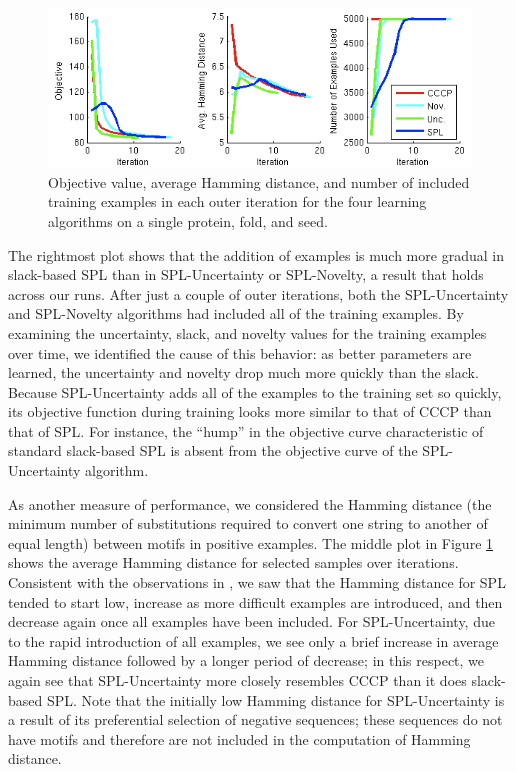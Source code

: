 \documentclass{article}
\begin{document}
\begin{figure}
\includegraphics[scale = 0.7]{ExampleMotifRun_WithNovelty_small2.png}
\caption{Objective value, average Hamming distance, and number of included training examples in each outer iteration for the four learning algorithms on a single protein, fold, and seed.}
\label{fig:exrun}
\end{figure}

The rightmost plot shows that the addition of examples is much more gradual in slack-based SPL than in SPL-Uncertainty or SPL-Novelty, a result that holds across our runs. After just a couple of outer iterations, both the SPL-Uncertainty and SPL-Novelty algorithms had included all of the training examples. By examining the uncertainty, slack, and novelty values for the training examples over time, we identified the cause of this behavior: as better parameters are learned, the uncertainty and novelty drop much more quickly than the slack. Because SPL-Uncertainty adds all of the examples to the training set so quickly, its objective function during training looks more similar to that of CCCP than that of SPL. For instance, the ``hump'' in the objective curve characteristic of standard slack-based SPL is absent from the objective curve of the SPL-Uncertainty algorithm.

As another measure of performance, we considered the Hamming distance (the minimum number of substitutions required to convert one string to another of equal length) between motifs in positive examples. The middle plot in Figure \ref{fig:exrun} shows the average Hamming distance for selected samples over iterations. Consistent with the observations in \cite{SPL}, we saw that the Hamming distance for SPL tended to start low, increase as more difficult examples are introduced, and then decrease again once all examples have been included. For SPL-Uncertainty, due to the rapid introduction of all examples, we see only a brief increase in average Hamming distance followed by a longer period of decrease; in this respect, we again see that SPL-Uncertainty more closely resembles CCCP than it does slack-based SPL.  Note that the initially low Hamming distance for SPL-Uncertainty is a result of its preferential selection of negative sequences; these sequences do not have motifs and therefore are not included in the computation of Hamming distance.
\end{document}
